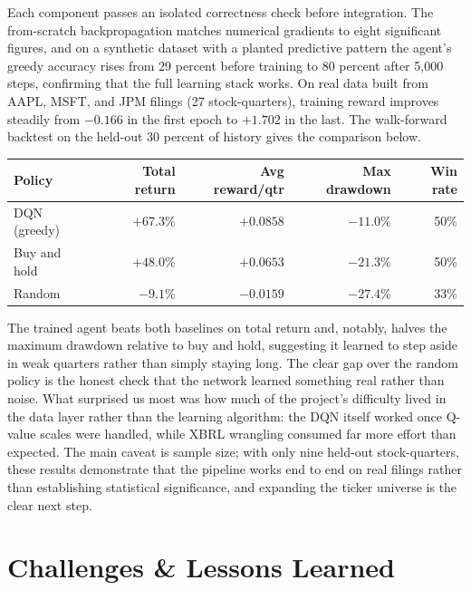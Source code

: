 \documentclass[11pt, letterpaper]{article}
\begin{document}
Each component passes an isolated correctness check before integration. The from-scratch backpropagation matches numerical gradients to eight significant figures, and on a synthetic dataset with a planted predictive pattern the agent's greedy accuracy rises from 29 percent before training to 80 percent after 5{,}000 steps, confirming that the full learning stack works. On real data built from AAPL, MSFT, and JPM filings (27 stock-quarters), training reward improves steadily from $-0.166$ in the first epoch to $+1.702$ in the last. The walk-forward backtest on the held-out 30 percent of history gives the comparison below.

\begin{center}
\begin{tabular}{lrrrr}
\toprule
\textbf{Policy} & \textbf{Total return} & \textbf{Avg reward/qtr} & \textbf{Max drawdown} & \textbf{Win rate} \\
\midrule
DQN (greedy)   & $+67.3\%$ & $+0.0858$ & $-11.0\%$ & 50\% \\
Buy and hold   & $+48.0\%$ & $+0.0653$ & $-21.3\%$ & 50\% \\
Random         & $-9.1\%$  & $-0.0159$ & $-27.4\%$ & 33\% \\
\bottomrule
\end{tabular}
\end{center}

The trained agent beats both baselines on total return and, notably, halves the maximum drawdown relative to buy and hold, suggesting it learned to step aside in weak quarters rather than simply staying long. The clear gap over the random policy is the honest check that the network learned something real rather than noise. What surprised us most was how much of the project's difficulty lived in the data layer rather than the learning algorithm: the DQN itself worked once Q-value scales were handled, while XBRL wrangling consumed far more effort than expected. The main caveat is sample size; with only nine held-out stock-quarters, these results demonstrate that the pipeline works end to end on real filings rather than establishing statistical significance, and expanding the ticker universe is the clear next step.

\section{Challenges \& Lessons Learned}
\end{document}
